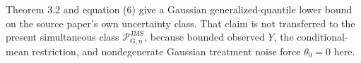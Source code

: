 Theorem 3.2 and equation (6) give a Gaussian generalized-quantile lower bound on the source paper's own uncertainty class. That claim is not transferred to the present simultaneous class \(\mathcal P_{\mathrm G,n}^{\mathrm{JMS}}\), because bounded observed \(Y\), the conditional-mean restriction, and nondegenerate Gaussian treatment noise force \(\theta_0=0\) here.